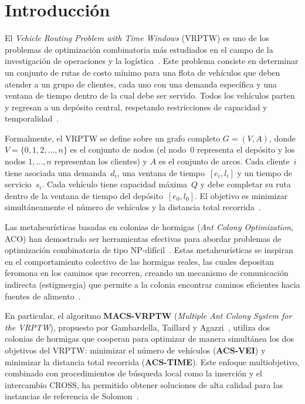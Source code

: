 \documentclass[12pt, letterpaper]{article}
\begin{document}
\newpage
\section{Introducción}
\label{sec:introduccion}

El \textit{Vehicle Routing Problem with Time Windows} (VRPTW) es uno de los problemas de optimización combinatoria más estudiados en el campo de la investigación de operaciones y la logística~\cite{solomon1987}. Este problema consiste en determinar un conjunto de rutas de costo mínimo para una flota de vehículos que deben atender a un grupo de clientes, cada uno con una demanda específica y una ventana de tiempo dentro de la cual debe ser servido. Todos los vehículos parten y regresan a un depósito central, respetando restricciones de capacidad y temporalidad~\cite{hasle2007}.

Formalmente, el VRPTW se define sobre un grafo completo $G = (V, A)$, donde $V = \{0, 1, 2, \ldots, n\}$ es el conjunto de nodos (el nodo~$0$ representa el depósito y los nodos $1, \ldots, n$ representan los clientes) y $A$ es el conjunto de arcos. Cada cliente~$i$ tiene asociada una demanda~$d_i$, una ventana de tiempo~$[e_i, l_i]$ y un tiempo de servicio~$s_i$. Cada vehículo tiene capacidad máxima~$Q$ y debe completar su ruta dentro de la ventana de tiempo del depósito~$[e_0, l_0]$. El objetivo es minimizar simultáneamente el número de vehículos y la distancia total recorrida~\cite{gambardella1999}.

Las metaheurísticas basadas en colonias de hormigas (\textit{Ant Colony Optimization}, ACO) han demostrado ser herramientas efectivas para abordar problemas de optimización combinatoria de tipo NP-difícil~\cite{dorigo1996}. Estas metaheurísticas se inspiran en el comportamiento colectivo de las hormigas reales, las cuales depositan feromona en los caminos que recorren, creando un mecanismo de comunicación indirecta (estigmergia) que permite a la colonia encontrar caminos eficientes hacia fuentes de alimento~\cite{dorigo1997}.

En particular, el algoritmo \textbf{MACS-VRPTW} (\textit{Multiple Ant Colony System for the VRPTW}), propuesto por Gambardella, Taillard y Agazzi~\cite{gambardella1999}, utiliza dos colonias de hormigas que cooperan para optimizar de manera simultánea los dos objetivos del VRPTW: minimizar el número de vehículos (\textbf{ACS-VEI}) y minimizar la distancia total recorrida (\textbf{ACS-TIME}). Este enfoque multiobjetivo, combinado con procedimientos de búsqueda local como la inserción y el intercambio CROSS, ha permitido obtener soluciones de alta calidad para las instancias de referencia de Solomon~\cite{solomon1987}.
\end{document}
